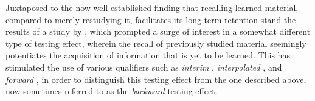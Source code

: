 \documentclass[../main.tex]{subfiles}
\begin{document}
Juxtaposed to the now well established finding that recalling learned material, compared to merely restudying it, facilitates its long-term retention \citep{roedigeriiiPowerTestingMemory2006, roedigeriiiTestEnhancedLearningTaking2006, rowlandEffectTestingRestudy2014, adesopeRethinkingUseTests2017} stand the results of a study by \cite{szpunarTestingStudyInsulates2008}, which prompted a surge of interest in a somewhat different type of testing effect, wherein the recall of previously studied material seemingly potentiates the acquisition of information that is yet to be learned. This has stimulated the use of various qualifiers such as \textit{interim} \citep{wissmanInterimTestEffect2011}, \textit{interpolated} \citep{szpunarInterpolatedMemoryTests2013}, and \textit{forward} \citep{pastotterRetrievalPracticeEnhances2014,yangEnhancingLearningRetrieval2018}, in order to distinguish this testing effect from the one described above, now sometimes referred to as the \textit{backward} testing effect.

{
    \biblio
}
\end{document}
